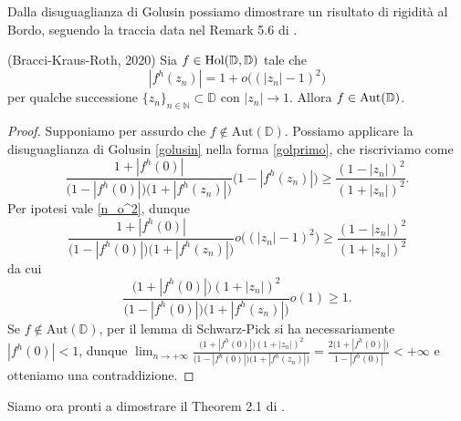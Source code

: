 Dalla disuguaglianza di Golusin possiamo dimostrare un risultato di rigidità al Bordo, seguendo la traccia data nel Remark 5.6 di \cite{BKR}.

\begin{thm} \label{boundary_schwarz_pick}
  (Bracci-Kraus-Roth, 2020) Sia $f \in \text{\normalfont{Hol}}(\mathbb{D},\mathbb{D})$ tale che
  \begin{equation} \label{n_o^2}
    |f^h(z_n)|=1+o\bigl((|z_n|-1)^2\bigr)
  \end{equation}
  per qualche successione $\{z_n\}_{n \in \mathbb{N}} \subset \mathbb{D}$ con $|z_n| \longrightarrow 1$. Allora $f \in \text{\normalfont{Aut}}(\mathbb{D})$.
\end{thm}

\begin{proof}
  Supponiamo per assurdo che $f \not\in \text{Aut}(\mathbb{D})$. Possiamo applicare la disuguaglianza di Golusin \ref{golusin} nella forma \eqref{golprimo}, che riscriviamo come
  $$\frac{1+|f^h(0)|}{\bigl(1-|f^h(0)|\bigr)\bigl(1+|f^h(z_n)|\bigr)}\bigl(1-|f^h(z_n)|\bigr) \ge \frac{(1-|z_n|)^2}{(1+|z_n|)^2}.$$
  Per ipotesi vale \eqref{n_o^2}, dunque
  $$\frac{1+|f^h(0)|}{\bigl(1-|f^h(0)|\bigr)\bigl(1+|f^h(z_n)|\bigr)}o\bigl((|z_n|-1)^2\bigr) \ge \frac{(1-|z_n|)^2}{(1+|z_n|)^2}$$
  da cui
  $$\frac{\bigl(1+|f^h(0)|\bigr)(1+|z_n|)^2}{\bigl(1-|f^h(0)|\bigr)\bigl(1+|f^h(z_n)|\bigr)}o(1) \ge 1.$$
  Se $f \not\in \text{Aut}(\mathbb{D})$, per il lemma di Schwarz-Pick si ha necessariamente $|f^h(0)|<1$, dunque $\displaystyle \lim_{n \longrightarrow +\infty} \frac{\bigl(1+|f^h(0)|\bigr)(1+|z_n|)^2}{\bigl(1-|f^h(0)|\bigr)\bigl(1+|f^h(z_n)|\bigr)}=\frac{2\bigl(1+|f^h(0)|\bigr)}{1-|f^h(0)|} < +\infty$ e otteniamo una contraddizione.
\end{proof}

Siamo ora pronti a dimostrare il Theorem 2.1 di \cite{BK}.

